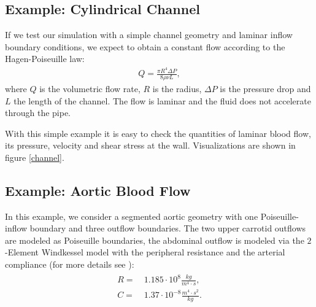 \documentclass[a4paper, 11pt, twoside]{article}
\begin{document}
\subsection{Example: Cylindrical Channel}\label{sectionChannel}
If we test our simulation with a simple channel geometry and laminar inflow boundary conditions, we expect to obtain a constant flow according to the Hagen-Poiseuille law:
\begin{align}
Q = \frac{\pi R^4 \Delta P}{8 \rho \nu L},
\end{align}
where $Q$ is the volumetric flow rate, $R$ is the radius, $\Delta P$ is the pressure drop and $L$ the length of 
the channel.
The flow is laminar and the fluid does not accelerate through the pipe.

With this simple example it is easy to check the quantities of laminar blood flow, 
its pressure, velocity and shear stress at the wall. Visualizations are shown in figure \ref{channel}.

\subsection{Example: Aortic Blood Flow}\label{sectionAorta}
In this example, we consider a segmented aortic geometry with one Poiseuille-inflow boundary and three outflow boundaries. 
The two upper carrotid outflows are modeled as Poiseuille boundaries, the abdominal outflow is modeled via the $2$-Element Windkessel model with the peripheral resistance and the arterial compliance (for more details see \cite{laskey}):
\begin{align}
\begin{aligned}
 R=&\ 1.185 \cdot 10^8 \frac{kg}{m^4 \cdot s},\\
 C=&\ 1.37 \cdot 10^{-8} \frac{m^4 \cdot s^2}{kg}.
\end{aligned}
\end{align}
\end{document}
